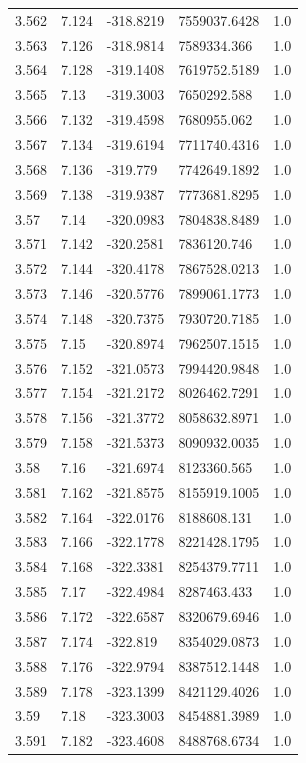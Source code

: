 \begin{tabular}{lllll}
3.562 & 7.124 & -318.8219 & 7559037.6428 & 1.0 \\
3.563 & 7.126 & -318.9814 & 7589334.366 & 1.0 \\
3.564 & 7.128 & -319.1408 & 7619752.5189 & 1.0 \\
3.565 & 7.13 & -319.3003 & 7650292.588 & 1.0 \\
3.566 & 7.132 & -319.4598 & 7680955.062 & 1.0 \\
3.567 & 7.134 & -319.6194 & 7711740.4316 & 1.0 \\
3.568 & 7.136 & -319.779 & 7742649.1892 & 1.0 \\
3.569 & 7.138 & -319.9387 & 7773681.8295 & 1.0 \\
3.57 & 7.14 & -320.0983 & 7804838.8489 & 1.0 \\
3.571 & 7.142 & -320.2581 & 7836120.746 & 1.0 \\
3.572 & 7.144 & -320.4178 & 7867528.0213 & 1.0 \\
3.573 & 7.146 & -320.5776 & 7899061.1773 & 1.0 \\
3.574 & 7.148 & -320.7375 & 7930720.7185 & 1.0 \\
3.575 & 7.15 & -320.8974 & 7962507.1515 & 1.0 \\
3.576 & 7.152 & -321.0573 & 7994420.9848 & 1.0 \\
3.577 & 7.154 & -321.2172 & 8026462.7291 & 1.0 \\
3.578 & 7.156 & -321.3772 & 8058632.8971 & 1.0 \\
3.579 & 7.158 & -321.5373 & 8090932.0035 & 1.0 \\
3.58 & 7.16 & -321.6974 & 8123360.565 & 1.0 \\
3.581 & 7.162 & -321.8575 & 8155919.1005 & 1.0 \\
3.582 & 7.164 & -322.0176 & 8188608.131 & 1.0 \\
3.583 & 7.166 & -322.1778 & 8221428.1795 & 1.0 \\
3.584 & 7.168 & -322.3381 & 8254379.7711 & 1.0 \\
3.585 & 7.17 & -322.4984 & 8287463.433 & 1.0 \\
3.586 & 7.172 & -322.6587 & 8320679.6946 & 1.0 \\
3.587 & 7.174 & -322.819 & 8354029.0873 & 1.0 \\
3.588 & 7.176 & -322.9794 & 8387512.1448 & 1.0 \\
3.589 & 7.178 & -323.1399 & 8421129.4026 & 1.0 \\
3.59 & 7.18 & -323.3003 & 8454881.3989 & 1.0 \\
3.591 & 7.182 & -323.4608 & 8488768.6734 & 1.0 \\

\end{tabular}
